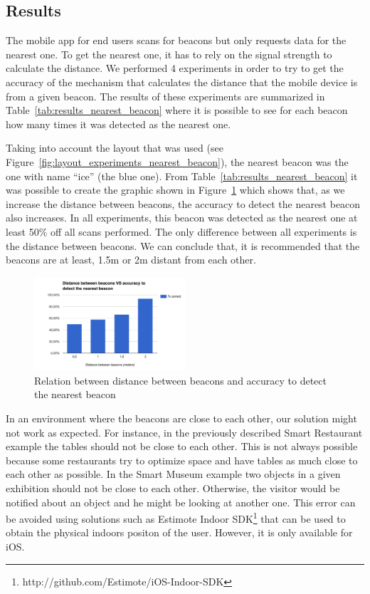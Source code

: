 \subsection{Results}
\label{sub:evaluation_nearest_beacon_results}
The mobile app for end users scans for beacons but only requests data for the nearest one. To get the nearest one, it has to rely on the signal strength to calculate the distance. We performed 4 experiments in order to try to get the accuracy of the mechanism that calculates the distance that the mobile device is from a given beacon.
The results of these experiments are summarized in Table~\ref{tab:results_nearest_beacon} where it is possible to see for each beacon how many times it was detected as the nearest one.

Taking into account the layout that was used (see Figure~\ref{fig:layout_experiments_nearest_beacon}), the nearest beacon was the one with name ``ice'' (the blue one).
From Table~\ref{tab:results_nearest_beacon} it was possible to create the graphic shown in Figure~\ref{fig:results_experiments_nearest_beacon} which shows that, as we increase the distance between beacons, the accuracy to detect the nearest beacon also increases.
In all experiments, this beacon was detected as the nearest one at least 50\% off all scans performed.
The only difference between all experiments is the distance between beacons.
We can conclude that, it is recommended that the beacons are at least, 1.5m or 2m distant from each other.


\begin{figure}[!ht]
  \centering
    \includegraphics[width=0.5\textwidth, keepaspectratio]{images/results_nearest_beacon}
    \caption[Distance between beacons vs Accuracy]{Relation between distance between beacons and accuracy to detect the nearest beacon}
    \label{fig:results_experiments_nearest_beacon}
\end{figure}

In an environment where the beacons are close to each other, our solution might not work as expected.
For instance, in the previously described Smart Restaurant example
the tables should not be close to each other. This is not always possible because some restaurants try to optimize space and have tables as much close to each other as possible.
In the Smart Museum example two objects in a given exhibition should not be close to each other.
Otherwise, the visitor would be notified about an object and he might be looking at another one.
This error can be avoided using solutions such as Estimote Indoor \gls{SDK}\footnote{http://github.com/Estimote/iOS-Indoor-SDK} that can be used to obtain the physical indoors positon of the user.
However, it is only available for iOS.

